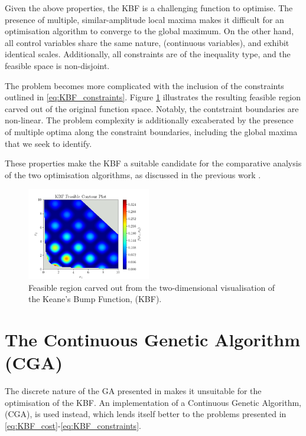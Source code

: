 \documentclass[10pt]{article}
\begin{document}
\begin{multicols}{2}
Given the above properties, the KBF is a challenging function to optimise. The presence of multiple, similar-amplitude local maxima makes it difficult for an optimisation algorithm to converge to the global maximum. On the other hand, all control variables share the same nature, (continuous variables), and exhibit identical scales. Additionally, all constraints are of the inequality type, and the feasible space is non-disjoint.

The problem becomes more complicated with the inclusion of the constraints outlined in \ref{eq:KBF_constraints}. Figure \ref{fig:KBF_Feasible} illustrates the resulting feasible region carved out of the original function space. Notably, the contstraint boundaries are non-linear. The problem complexity is additionally excaberated by the presence of multiple optima along the constraint boundaries, including the global maxima that we seek to identify.

These properties make the KBF a suitable candidate for the comparative analysis of the two optimisation algorithms, as discussed in the previous work \cite{ELBELTAGY1999639}.

\begin{figure}[H]
    \centering
    \includegraphics[width=0.48\textwidth]{../figures/KBF/KBF Feasible_contour.png}
    \captionsetup{justification=centering}
    \caption{Feasible region carved out from the two-dimensional visualisation of the Keane's Bump Function, (KBF).}
    \label{fig:KBF_Feasible}
\end{figure}

\section{The Continuous Genetic Algorithm (CGA)}
\label{sec:CGA}

The discrete nature of the GA presented in \cite{parks2023geneticalgorithms} makes it unsuitable for the optimisation of the KBF. An implementation of a Continuous Genetic Algorithm, (CGA), is used instead, which lends itself better to the problems presented in \ref{eq:KBF_cost}-\ref{eq:KBF_constraints}.


\end{multicols}
\end{document}
